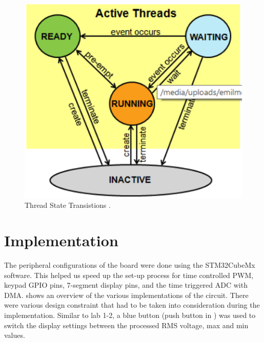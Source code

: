 \documentclass[a4paper,titlepage]{article}
\begin{document}
\begin{figure}[!htb]
  \centering
  \includegraphics[width=\columnwidth]{figures/active_threads.png}
  \caption{Thread State Transistions \cite{lab4_tutorial}.}
  \label{fig:active_threads}
\end{figure}


\section{Implementation}
The peripheral configurations of the board were done using the STM32CubeMx software. This helped us speed up the set-up process for time controlled PWM, keypad GPIO pins, 7-segment display pins, and the time triggered ADC with DMA.  shows an overview of the various implementations of the circuit. There were various design constraint that had to be taken into consideration during the implementation.  Similar to lab 1-2, a blue button (push button in ) was used to switch the display settings between the processed RMS voltage, max and min values.
\end{document}
